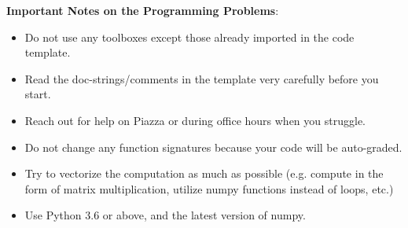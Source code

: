 \textbf{Important Notes on the Programming Problems}:
\begin{itemize}
    \item Do not use any toolboxes except those already imported in the code template. 
    \item Read the doc-strings/comments in the template very carefully before you start. 
    \item Reach out for help on Piazza or during office hours when you struggle. 
    \item Do not change any function signatures because your code will be auto-graded. 
    \item Try to vectorize the computation as much as possible (e.g. compute in the form of matrix multiplication, utilize numpy functions instead of loops, etc.)
    \item Use Python 3.6 or above, and the latest version of numpy.
\end{itemize}




